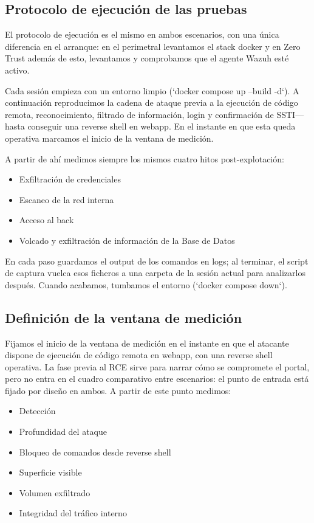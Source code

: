 \documentclass[11pt,spanish,listoffigures,listoftables]{tfgetsinf}
\begin{document}
        \subsection{Protocolo de ejecución de las pruebas}
        El protocolo de ejecución es el mismo en ambos escenarios, con una única diferencia en el arranque: en el perimetral levantamos el stack docker y en Zero Trust además de esto, levantamos y comprobamos que el agente Wazuh esté activo.

        Cada sesión empieza con un entorno limpio (`docker compose up --build -d`). A continuación reproducimos la cadena de ataque previa a la ejecución de código remota, reconocimiento, filtrado de información, login y confirmación de SSTI— hasta conseguir una reverse shell en webapp. En el instante en que esta queda operativa marcamos el inicio de la ventana de medición.
        
        A partir de ahí medimos siempre los mismos cuatro hitos post-explotación:
        \begin{itemize}
            \item Exfiltración de credenciales
            \item Escaneo de la red interna
            \item Acceso al back
            \item Volcado y exfiltración de información de la Base de Datos
        \end{itemize}
        
        En cada paso guardamos el output de los comandos en logs; al terminar, el script de captura vuelca esos ficheros a una carpeta de la sesión actual para analizarlos después. Cuando acabamos, tumbamos el entorno (`docker compose down`).
        
        \subsection{Definición de la ventana de medición}
        \label{sec:6.1.3}
        Fijamos el inicio de la ventana de medición en el instante en que el atacante dispone de ejecución de código remota en webapp, con una reverse shell operativa. La fase previa al RCE sirve para narrar cómo se compromete el portal, pero no entra en el cuadro comparativo entre escenarios: el punto de entrada está fijado por diseño en ambos. A partir de este punto medimos:
        \begin{itemize}
            \item Detección
            \item Profundidad del ataque
            \item Bloqueo de comandos desde reverse shell
            \item Superficie visible
            \item Volumen exfiltrado
            \item Integridad del tráfico interno
        \end{itemize}
        
\end{document}
